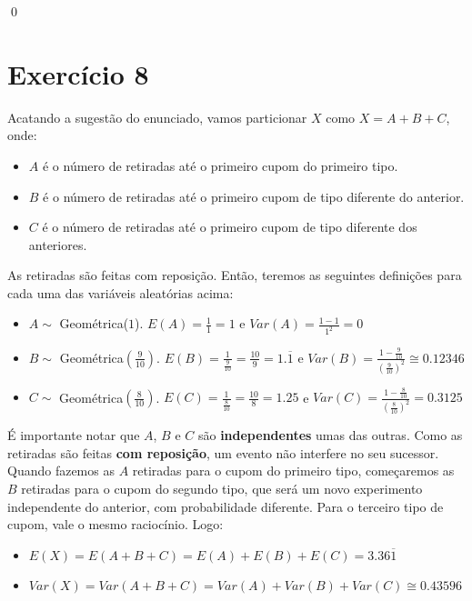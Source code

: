 \documentclass[12pt,letterpaper]{article}
\begin{document}
	\qed
	
	\section*{Exercício 8}
	
	Acatando a sugestão do enunciado, vamos particionar $X$ como $X = A+B+C$, onde:
	
	\begin{itemize}
		\item $A$ é o número de retiradas até o primeiro cupom do primeiro tipo.
		\item $B$ é o número de retiradas até o primeiro cupom de tipo diferente do anterior.
		\item $C$ é o número de retiradas até o primeiro cupom de tipo diferente dos anteriores.
	\end{itemize}
	
	As retiradas são feitas com reposição. Então, teremos as seguintes definições para cada uma das variáveis aleatórias acima:
	
	\begin{itemize}
		\item $A \sim$ Geométrica($1$). $E(A) = \frac{1}{1} = 1$ e $Var(A) = \frac{1-1}{1^2} = 0$
		\item $B \sim$ Geométrica$\left(\frac{9}{10}\right)$. $E(B) = \frac{1}{\frac{9}{10}} = \frac{10}{9} =1.\overline{1}$ e $Var(B) = \frac{1-\frac{9}{10}}{(\frac{9}{10})^2} \cong 0.12346$
		\item $C \sim$ Geométrica$\left(\frac{8}{10}\right)$. $E(C) = \frac{1}{\frac{8}{10}}= \frac{10}{8} = 1.25$ e $Var(C) = \frac{1-\frac{8}{10}}{(\frac{8}{10})^2} = 0.3125$
	\end{itemize}
	
	É importante notar que $A$, $B$ e $C$ são \textbf{independentes} umas das outras. Como as retiradas são feitas \textbf{com reposição}, um evento não interfere no seu sucessor. Quando fazemos as $A$ retiradas para o cupom do primeiro tipo, começaremos as $B$ retiradas para o cupom do segundo tipo, que será um novo experimento independente do anterior, com probabilidade diferente. Para o terceiro tipo de cupom, vale o mesmo raciocínio. Logo:
	
	\begin{itemize}
		\item $E(X) = E(A+B+C) = E(A) + E(B) + E(C) = 3.36\overline{1}$
		\item $Var(X) = Var(A+B+C) = Var(A) + Var(B) + Var(C) \cong 0.43596$
	\end{itemize}
			
	 
\end{document}
